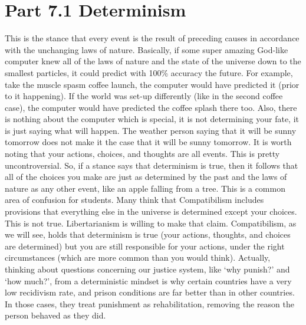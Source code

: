 \section{Part 7.1 Determinism}

This is the stance that every event is the result of preceding causes in accordance with the unchanging laws of nature. Basically, if some super amazing God-like computer knew all of the laws of nature and the state of the universe down to the smallest particles, it could predict with 100\% accuracy the future. For example, take the muscle spasm coffee launch, the computer would have predicted it (prior to it happening). If the world was set-up differently (like in the second coffee case), the computer would have predicted the coffee splash there too. Also, there is nothing about the computer which is special, it is not determining your fate, it is just saying what will happen. The weather person saying that it will be sunny tomorrow does not make it the case that it will be sunny tomorrow. It is worth noting that your actions, choices, and thoughts are all events. This is pretty uncontroversial. So, if a stance says that determinism is true, then it follows that all of the choices you make are just as determined by the past and the laws of nature as any other event, like an apple falling from a tree. This is a common area of confusion for students. Many think that Compatibilism includes provisions that everything else in the universe is determined except your choices. This is not true. Libertarianism is willing to make that claim. Compatibilism, as we will see, holds that determinism is true (your actions, thoughts, and choices are determined) but you are still responsible for your actions, under the right circumstances (which are more common than you would think).  Actually, thinking about questions concerning our justice system, like `why punish?' and `how much?', from a deterministic mindset is why certain countries have a very low recidivism rate, and prison conditions are far better than in other countries. In those cases, they treat punishment as rehabilitation, removing the reason the person behaved as they did. 

